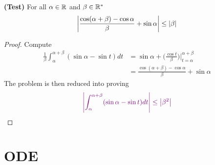 \documentclass{report}
\begin{document}
\begin{theorem}
\textbf{(Test)} For all $\alpha \in\mathbb{R}$ and $\beta \in\mathbb{R}^*$ 
\begin{align*}
  \left|\frac{\cos (\alpha +\beta ) - \cos \alpha }{\beta } + \sin \alpha \right|\leq \left|\beta \right|
\end{align*}
\end{theorem}
\begin{proof}
Compute 
\begin{align*}
\frac{1}{\beta }\int_{\alpha }^{\alpha +\beta } (\sin \alpha -\sin t)dt&= \sin \alpha + \Big( \frac{\cos t}{\beta }  \Big)\Big|_{t=\alpha }^{\alpha +\beta }\\
&= \frac{\cos (\alpha +\beta )- \cos \alpha }{\beta } + \sin \alpha 
\end{align*}
The problem is then reduced into proving 
\begin{align*}
  \textcolor{violet}{\left|\int_{\alpha }^{\alpha +\beta } (\sin \alpha -\sin t)dt\right|\leq \left|\beta ^2\right|}
\end{align*}

\end{proof}

\chapter{ODE}
\end{document}
